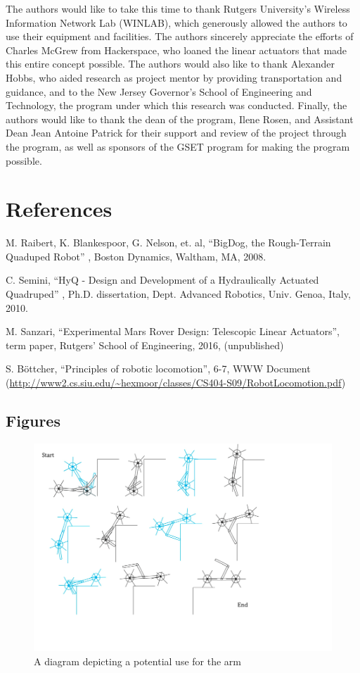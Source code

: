 \documentclass[12pt]{article}
\numberwithin{figure}{section}
\begin{document}
\begin{multicols}{2}
The authors would like to take this time to thank Rutgers University’s Wireless Information Network Lab (WINLAB), which generously allowed the authors to use their equipment and facilities. The authors sincerely appreciate the efforts of Charles McGrew from Hackerspace, who loaned the linear actuators that made this entire concept possible. The authors would also like to thank Alexander Hobbs, who aided research as project mentor by providing transportation and guidance, and to the New Jersey Governor’s School of Engineering and Technology, the program under which this research was conducted. Finally, the authors would like to thank the dean of the program, Ilene Rosen, and Assistant Dean Jean Antoine Patrick for their support and review of the project through the program, as well as sponsors of the GSET program for making the program possible.
\section{References}
\begin{thebibliography}{4}
M. Raibert, K. Blankespoor, G. Nelson, et. al, “BigDog, the Rough-Terrain Quaduped Robot” , Boston Dynamics, Waltham, MA, 2008.
 
C. Semini, “HyQ - Design and Development of a Hydraulically Actuated Quadruped” , Ph.D. dissertation, Dept. Advanced Robotics, Univ. Genoa, Italy, 2010.
 
M. Sanzari, “Experimental Mars Rover Design: Telescopic Linear Actuators”, term paper, Rutgers’ School of Engineering, 2016, (unpublished)

S. Böttcher, “Principles of robotic locomotion”, 6-7, WWW Document (\url{http://www2.cs.siu.edu/~hexmoor/classes/CS404-S09/RobotLocomotion.pdf})
\end{thebibliography}
\end{multicols}

\begin{appendices}
\section{Figures}
\begin{figure}[H]
\includegraphics[scale=0.6]{Climbing_Diagram.png}
\caption{A diagram depicting a potential use for the arm \cite{sanzari-telescopic-actuator}}
\label{fig:climbing}
\end{figure}
\end{appendices}
\end{document}
